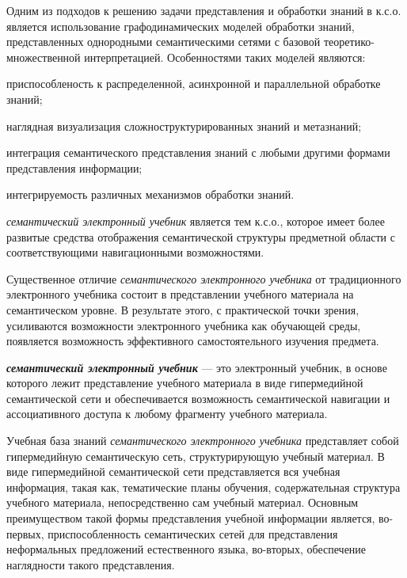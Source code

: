 Одним из подходов к решению задачи представления и обработки знаний в к.с.о. является использование графодинамических моделей обработки знаний, представленных однородными семантическими сетями с базовой теоретико-множественной интерпретацией. Особенностями таких моделей являются:

\begin{textitemize}
	\item приспособленость к распределенной, асинхронной и параллельной обработке знаний;
	\item наглядная визуализация сложноструктурированных знаний и метазнаний;
	\item интеграция семантического представления знаний с любыми другими формами представления информации;
	\item интегрируемость различных механизмов обработки знаний.
\end{textitemize}

\textit{семантический электронный учебник} является тем к.с.о., которое имеет более развитые средства отображения семантической структуры предметной области с соответствующими навигационными возможностями.

Существенное отличие \textit{семантического электронного учебника} от традиционного электронного учебника состоит в представлении учебного материала на семантическом уровне. В результате этого, с практической точки зрения, усиливаются возможности электронного учебника как обучающей среды, появляется возможность эффективного самостоятельного изучения предмета.

\textbf{\textit{семантический электронный учебник}} --- это электронный учебник, в основе которого лежит представление учебного материала в виде гипермедийной семантической сети и обеспечивается возможность семантической навигации и ассоциативного доступа к любому фрагменту учебного материала.

Учебная база знаний \textit{семантического электронного учебника} представляет собой гипермедийную семантическую сеть, структурирующую учебный материал. В виде гипермедийной семантической сети представляется вся учебная информация, такая как, тематические планы обучения, содержательная структура учебного материала, непосредственно сам учебный материал. Основным преимуществом такой формы представления учебной информации является, во-первых, приспособленность семантических сетей для представления неформальных предложений естественного языка, во-вторых, обеспечение наглядности такого представления.

